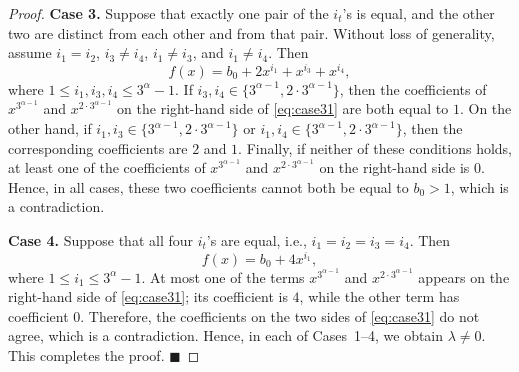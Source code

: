 \documentclass[12pt]{article}
\begin{document}
\begin{proof}
\medskip

\textbf{Case 3.} Suppose that exactly one pair of the $i_t$'s is equal, and the other two are distinct from each other and from that pair. Without loss of generality, assume $i_1=i_2$, $i_3\neq i_4$, $i_1\neq i_3$, and $i_1\neq i_4$. Then
\[
f(x)=b_0+2x^{i_1}+x^{i_3}+x^{i_4},
\]
where $1\le i_1,i_3,i_4\le 3^\alpha-1$.
If $i_3,i_4\in\{3^{\alpha-1},2\cdot3^{\alpha-1}\}$, then the coefficients of $x^{3^{\alpha-1}}$ and $x^{2\cdot3^{\alpha-1}}$ on the right-hand side of \eqref{eq:case31} are both equal to $1$. On the other hand, if $i_1,i_3\in\{3^{\alpha-1},2\cdot3^{\alpha-1}\}$ or $i_1,i_4\in\{3^{\alpha-1},2\cdot3^{\alpha-1}\}$, then the corresponding coefficients are $2$ and $1$. Finally, if neither of these conditions holds, at least one of the coefficients of $x^{3^{\alpha-1}}$ and $x^{2\cdot3^{\alpha-1}}$ on the right-hand side is $0$. Hence, in all cases, these two coefficients cannot both be equal to $b_0>1$, which is a contradiction.

\medskip

\textbf{Case 4.} Suppose that all four $i_t$'s are equal, i.e., $i_1=i_2=i_3=i_4$. Then
\[
f(x)=b_0+4x^{i_1},
\]
where $1\le i_1\le 3^\alpha-1$. At most one of the terms $x^{3^{\alpha-1}}$ and $x^{2\cdot3^{\alpha-1}}$ appears on the right-hand side of \eqref{eq:case31}; its coefficient is $4$, while the other term has coefficient $0$. Therefore, the coefficients on the two sides of \eqref{eq:case31} do not agree, which is a contradiction. Hence, in each of Cases~1--4, we obtain $\lambda\neq0$. This completes the proof.
\hfill$\blacksquare$
	\end{proof}
	
\end{document}
